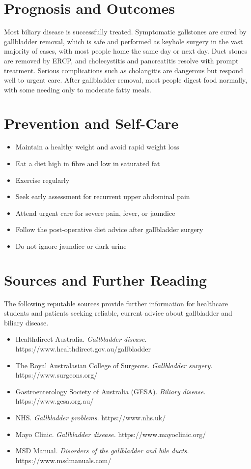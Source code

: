 \section*{Prognosis and Outcomes}
Most biliary disease is successfully treated. Symptomatic gallstones are cured by gallbladder removal, which is safe and performed as keyhole surgery in the vast majority of cases, with most people home the same day or next day. Duct stones are removed by ERCP, and cholecystitis and pancreatitis resolve with prompt treatment. Serious complications such as cholangitis are dangerous but respond well to urgent care. After gallbladder removal, most people digest food normally, with some needing only to moderate fatty meals.

\section*{Prevention and Self-Care}
\begin{itemize}
    \item Maintain a healthy weight and avoid rapid weight loss
    \item Eat a diet high in fibre and low in saturated fat
    \item Exercise regularly
    \item Seek early assessment for recurrent upper abdominal pain
    \item Attend urgent care for severe pain, fever, or jaundice
    \item Follow the post-operative diet advice after gallbladder surgery
    \item Do not ignore jaundice or dark urine
\end{itemize}

\section*{Sources and Further Reading}
The following reputable sources provide further information for healthcare students and patients seeking reliable, current advice about gallbladder and biliary disease.
\begin{itemize}
    \item Healthdirect Australia. \textit{Gallbladder disease.} https://www.healthdirect.gov.au/gallbladder
    \item The Royal Australasian College of Surgeons. \textit{Gallbladder surgery.} https://www.surgeons.org/
    \item Gastroenterology Society of Australia (GESA). \textit{Biliary disease.} https://www.gesa.org.au/
    \item NHS. \textit{Gallbladder problems.} https://www.nhs.uk/
    \item Mayo Clinic. \textit{Gallbladder disease.} https://www.mayoclinic.org/
    \item MSD Manual. \textit{Disorders of the gallbladder and bile ducts.} https://www.msdmanuals.com/
\end{itemize}

